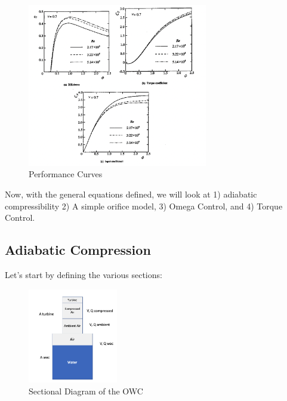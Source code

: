 \documentclass[conf]{new-aiaa}
\begin{document}
\begin{figure}[H]
\centering
\vspace{-6pt}
\includegraphics[trim={0cm 0cm 0cm 0cm},clip,width=0.7\textwidth]{performace_curves.png}
\vspace{-6pt}
\caption{Performance Curves}
\label{fig:performace_curves}
\end{figure}

Now, with the general equations defined, we will look at 1) adiabatic compressibility 2) A simple orifice model, 3) Omega Control, and 4) Torque Control.

\subsection{Adiabatic Compression}

Let's start by defining the various sections: 

\begin{figure}[H]
\centering
\vspace{-6pt}
\includegraphics[trim={0cm 0cm 0cm 0cm},clip,width=0.35\textwidth]{CompressionStages.png}
\vspace{-6pt}
\caption{Sectional Diagram of the OWC}
\label{fig:CompressionStages}
\end{figure}
\end{document}
